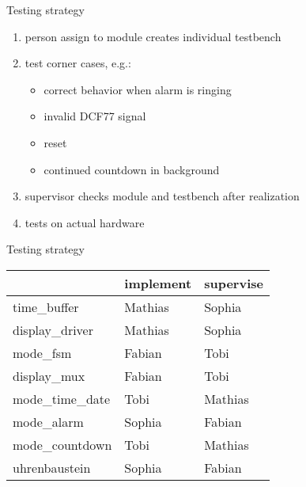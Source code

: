 \documentclass{beamer}
\begin{document}
\begin{frame}{Testing strategy}
	\begin{enumerate}
		\item person assign to module creates individual testbench
		\item test corner cases, e.g.: \begin{itemize}
			\item correct behavior when alarm is ringing
			\item invalid DCF77 signal
			\item reset
			\item continued countdown in background
		\end{itemize}
		\item supervisor checks module and testbench after realization
		\item tests on actual hardware
	\end{enumerate}
\end{frame}

\begin{frame}{Testing strategy}
	\begin{center}
		\begin{tabular}{lll}
			\toprule
									& implement   & supervise  \\ \midrule
			time\_buffer      & Mathias     & Sophia     \\
			display\_driver   & Mathias     & Sophia     \\
			mode\_fsm         & Fabian      & Tobi       \\
			display\_mux      & Fabian      & Tobi       \\
			mode\_time\_date  & Tobi        & Mathias    \\
			mode\_alarm       & Sophia      & Fabian     \\
			mode\_countdown   & Tobi        & Mathias    \\
			uhrenbaustein     & Sophia      & Fabian     \\ \bottomrule
		\end{tabular}
	\end{center}
\end{frame}
\end{document}
